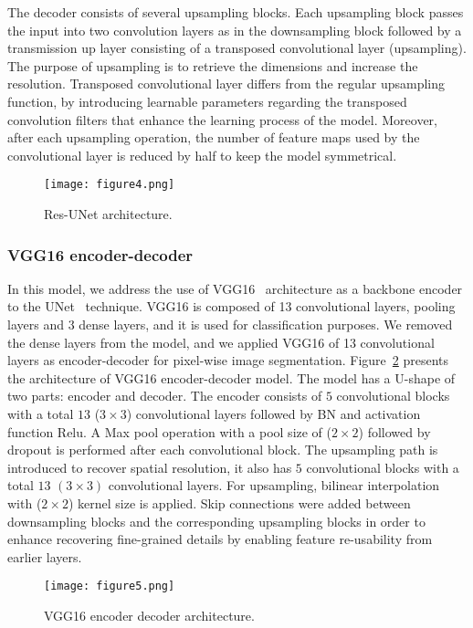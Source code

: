 The decoder consists of several upsampling blocks. 
Each upsampling block passes the input into two convolution layers as in the downsampling block followed by a transmission up layer consisting of a transposed convolutional layer (upsampling). 
The purpose of upsampling is to retrieve the dimensions and increase the resolution.
Transposed convolutional layer differs from the regular upsampling function, by introducing learnable parameters regarding the transposed convolution filters that enhance the learning process of the model. 
Moreover, after each upsampling operation, the number of feature maps used by the convolutional layer is reduced by half to keep the model symmetrical. 
\begin{figure} [h!]
	\begin{center}
		\texttt{[image: figure4.png]}
	\end{center}
	\caption{Res-UNet architecture.} 
	\label{fig:Unet}
\end{figure}
\subsubsection{VGG16 encoder-decoder}
In this model, we address the use of VGG16~\cite{Simonyan2015} architecture as a backbone encoder to the UNet~\cite{Ronneberger2015} technique.
VGG16 is composed of 13 convolutional layers, pooling layers and \(3\) dense layers, and it is used for classification purposes.
We removed the dense layers from the model, and we applied VGG16 of 13 convolutional layers as encoder-decoder for pixel-wise image segmentation.
Figure~\ref{vgg16} presents the architecture of VGG16 encoder-decoder model. 
The model has a U-shape of two parts: encoder and decoder.
The encoder consists of \(5\) convolutional blocks with a total \(13\)  (\(3\times3\)) convolutional layers followed by BN and activation function Relu.
A Max pool operation with a pool size of (\(2\times2\)) followed by dropout is performed after each convolutional block.  
The upsampling path is introduced to recover spatial resolution, it also has \(5\) convolutional blocks with a total \(13\) \((3\times 3)\) convolutional layers.
For upsampling, bilinear interpolation with (\(2\times2\)) kernel size is applied.
Skip connections were added between downsampling blocks and the corresponding upsampling blocks in order to enhance recovering fine-grained details by enabling feature re-usability from earlier layers.
\begin{figure} [h!]
	\begin{center}
		\texttt{[image: figure5.png]}
	\end{center}
	\caption{VGG16 encoder decoder architecture.} 
	\label{vgg16}
\end{figure}
